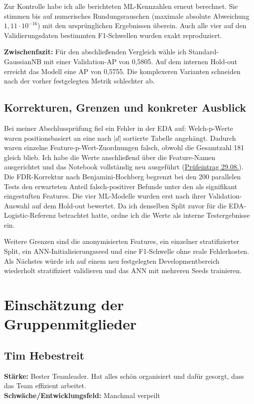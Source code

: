 \documentclass[10pt,a4paper]{article}
\newcommand{\resultbox}[1]{%
  \par\smallskip\noindent\colorbox{ADAlight}{%
    \parbox{\dimexpr\linewidth-2\fboxsep\relax}{\textbf{Zwischenfazit:} #1}}\par\smallskip}
\begin{document}
Zur Kontrolle habe ich alle berichteten ML-Kennzahlen erneut berechnet. Sie stimmen bis auf
numerisches Rundungsrauschen (maximale absolute Abweichung
\(1{,}11 \cdot 10^{-16}\)) mit den ursprünglichen Ergebnissen überein. Auch alle vier auf
den Validierungsdaten bestimmten F1-Schwellen wurden exakt reproduziert.

\resultbox{Für den abschließenden Vergleich wähle ich Standard-GaussianNB mit einer
Validation-AP von 0,5805. Auf dem internen Hold-out erreicht das Modell eine AP von 0,5755.
Die komplexeren Varianten schneiden nach der vorher festgelegten Metrik schlechter ab.}

\subsection{Korrekturen, Grenzen und konkreter Ausblick}

Bei meiner Abschlussprüfung fiel ein Fehler in der EDA auf: Welch-p-Werte waren
positionsbasiert an eine nach $|d|$ sortierte Tabelle angehängt. Dadurch waren einzelne
Feature-p-Wert-Zuordnungen falsch, obwohl die Gesamtzahl 181 gleich blieb. Ich habe die
Werte anschließend über die Feature-Namen ausgerichtet und das Notebook vollständig neu ausgeführt
(\hyperref[log:2908]{Prüfeintrag 29.08.}). Die FDR-Korrektur nach Benjamini-Hochberg
begrenzt bei den 200 parallelen Tests den erwarteten Anteil falsch-positiver Befunde unter
den als signifikant eingestuften Features. Die vier ML-Modelle wurden erst nach ihrer
Validation-Auswahl auf dem Hold-out bewertet. Da ich denselben Split zuvor für die
EDA-Logistic-Referenz betrachtet hatte, ordne ich die Werte als interne Testergebnisse ein.

Weitere Grenzen sind die anonymisierten Features, ein einzelner stratifizierter Split,
ein ANN-Initialisierungsseed und eine F1-Schwelle ohne reale Fehlerkosten. Als Nächstes
würde ich auf einem neu festgelegten Developmentbereich wiederholt stratifiziert validieren
und das ANN mit mehreren Seeds trainieren. 

\clearpage

\section{Einschätzung der Gruppenmitglieder}
\label{sec:team}


\subsection*{Tim Hebestreit}
\textbf{Stärke:} Bester Teamleader. Hat alles schön organisiert und dafür gesorgt, dass das Team effizient arbeitet. \\
\textbf{Schwäche/Entwicklungsfeld:} Manchmal verpeilt
\end{document}
